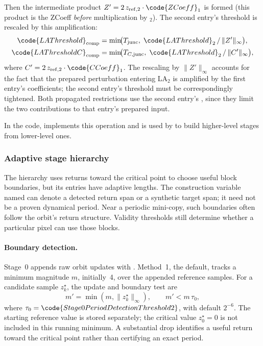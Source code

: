 Then the intermediate product
\(Z' = 2\,z_\mathrm{ref,2} \cdot \code{ZCoeff}_1\) is formed
(this product is the ZCoeff \emph{before} multiplication by \(_2\)).
The second entry's threshold is rescaled by this amplification:
\begin{align}
\code{LAThreshold}_\mathrm{comp}
  &= \min\!\bigl(
       T_\mathrm{junc},\;
       \code{LAThreshold}_2 \,/\, \lVert Z' \rVert_\infty
     \bigr),
\\
\code{LAThresholdC}_\mathrm{comp}
  &= \min\!\bigl(
       T_{C,\mathrm{junc}},\;
       \code{LAThreshold}_2 \,/\, \lVert C' \rVert_\infty
     \bigr),
\end{align}
where \(C' = 2\,z_\mathrm{ref,2} \cdot \code{CCoeff}_1\).
The rescaling by \(\lVert Z' \rVert_\infty\) accounts for the fact that
the prepared perturbation entering LA\(_2\) is amplified by the first
entry's coefficients; the second entry's threshold must be correspondingly
tightened.
Both propagated restrictions use the second entry's
, since they limit the two contributions to that
entry's prepared input.

In the code,  implements this operation and
is used by  to build higher-level stages from
lower-level ones.

\subsubsection{Adaptive stage hierarchy}
\label{sec:la-stage-hierarchy}

The hierarchy uses returns toward the critical point to choose useful
block boundaries, but its entries have adaptive lengths. The
construction variable named  can denote a detected return
span or a synthetic target span; it need not be a proven dynamical
period. Near a periodic mini-copy, such boundaries often follow the
orbit's return structure. Validity thresholds still determine whether
a particular pixel can use those blocks.

\paragraph{Boundary detection.}
Stage~0 appends raw orbit updates with .
Method~1, the default, tracks a minimum magnitude $m$, initially~4,
over the appended reference samples. For a candidate sample $z_k^\star$,
the update and boundary test are
\begin{equation}
m'=\min(m,\lVert z_k^\star\rVert_\infty),\qquad
m'<m\,\tau_0,
\label{eq:period-detect-minmag}
\end{equation}
where $\tau_0=\code{Stage0PeriodDetectionThreshold2}$, with default
$2^{-6}$. The starting reference value is stored separately; the
critical value $z_0^\star=0$ is not included in this running minimum.
A substantial drop identifies a useful return toward the critical
point rather than certifying an exact period.

